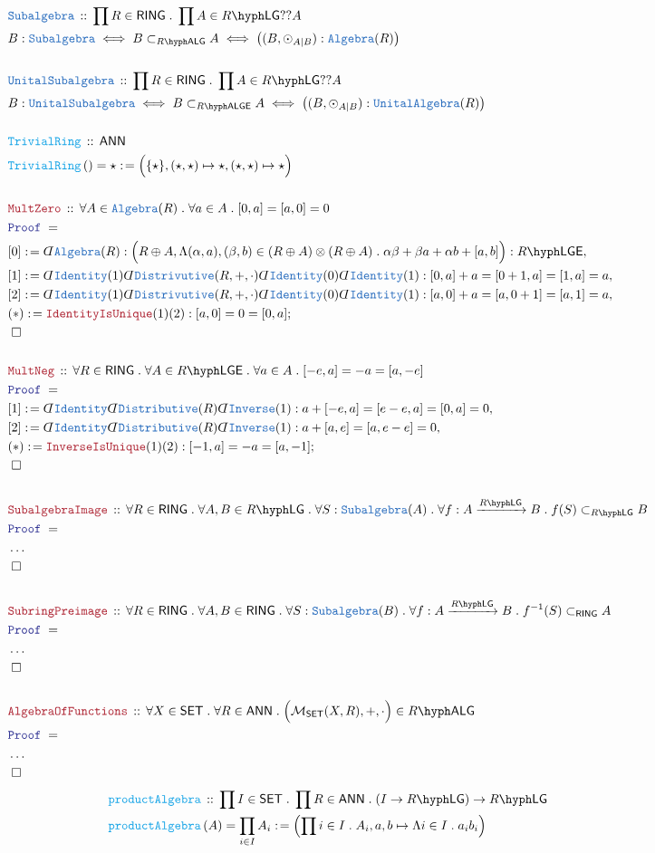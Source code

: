\documentclass[12pt]{scrartcl}%
\newcommand{\TYPE}[1]{\textcolor{NavyBlue}{\mathtt{#1}}}%
\newcommand{\FUNC}[1]{\textcolor{Cerulean}{\mathtt{#1}}}%
\newcommand{\LOGIC}[1]{\textcolor{Blue}{\mathtt{#1}}}%
\newcommand{\THM}[1]{\textcolor{Maroon}{\mathtt{#1}}}%
\renewcommand{\.}{\; . \;} %
\newcommand{\de}{: \kern 0.1pc =} %
\newcommand{\Act}[1]{\left( #1 \right)} %
\newcommand{\Theorem}[2]{& \THM{#1} \, :: \, #2 \\ & \Proof = \\ } %
\newcommand{\DeclareType}[2]{& \TYPE{#1} \, :: \, #2 \\}%
\newcommand{\DefineNamedType}[4]{& #1 : \TYPE{#2} \iff #3 \iff #4 \\}%
\newcommand{\DeclareFunc}[2]{& \FUNC{#1} \, :: \, #2 \\}%
\newcommand{\DefineNamedFunc}[4]{&  \FUNC{#1}\Act{#2} = #3 \de #4 \\}%
\newcommand{\Page}[1]{ \begin{align*} #1 \end{align*}  }%
\newcommand{ \bd }{ \ByDef }%
\newcommand{\NoProof}{ & \ldots \\ \EndProof}%
\newcommand{\Mor}{\mathcal{M}}%
\newcommand{\Say}[3]{& #1 \de #2 : #3, \\} %
\newcommand{\Conclude}[3]{& #1 \de #2 : #3; \\}%
\newcommand{\QED}{\; \square} %
\newcommand{\EndProof}{& \QED \\} %
\newcommand{\ByDef}{\rotatebox[origin=c]{-180}{$D$}}%
\newcommand{\Proof}{\LOGIC{Proof} \; } %
\newcommand{\Arrow}[1]{\xrightarrow{#1}}%
\newcommand{\SET}{\mathsf{SET}} %
\newcommand{\RING}{\mathsf{RING}} %
\newcommand{\ANN}{\mathsf{ANN}} %
\newcommand{\Algebra}{\TYPE{Algebra}}
\newcommand{\LALG}[1]{#1\hyph\mathsf{ALG}}%
\newcommand{\LALGE}[1]{#1\hyph\mathsf{ALGE}}%
\newcommand{\LLGE}[1]{#1\hyph\mathsf{LGE}}%
\newcommand{\LLG}[1]{#1\hyph\mathsf{LG}}%
\begin{document}
{}\Page{
	\DeclareType{Subalgebra}{\prod R \in \RING \. \prod A \in \LLG{R} ??A}
	\DefineNamedType{B}{Subalgebra}{B \subset_{\LALG{R}} A}{\big((B,\odot_{A|B}) : \TYPE{Algebra}(R)\big)}
	\\
	\DeclareType{UnitalSubalgebra}{\prod R \in \RING \. \prod A \in \LLG{R} ??A}
	\DefineNamedType{B}{UnitalSubalgebra}{B \subset_{\LALGE{R}} A}{\big((B,\odot_{A|B}) : \TYPE{UnitalAlgebra}(R)\big)}
	\\
	\DeclareFunc{TrivialRing}{ \ANN  }
	\DefineNamedFunc{TrivialRing}{}{\star}{\Big(\{\star\}, (\star,\star) \mapsto \star, (\star,\star) \mapsto \star \Big)}
	\\
	\Theorem{MultZero}{\forall A \in \Algebra(R) \. \forall a \in A \. [0,a] = [a,0] = 0}
	\Say{[0]}{ \bd \Algebra(R) }{ \Big( R \oplus A ,\Lambda (\alpha,a),(\beta,b) \in (R \oplus A) \otimes (R \oplus A) \. \alpha \beta + \beta a + \alpha b + [a, b]   \Big) : \LLGE{R}  }
	\Say{[1]}{ \bd \TYPE{Identity}(1)\bd \TYPE{Distrivutive}(R,+,\cdot)\bd\TYPE{Identity}(0)\bd\TYPE{Identity}(1)  }{  [0,a] + a = [0 + 1,a] = [1,a] = a   }
	\Say{[2]}{ \bd \TYPE{Identity}(1)\bd \TYPE{Distrivutive}(R,+,\cdot)\bd\TYPE{Identity}(0)\bd\TYPE{Identity}(1)  }{  [a,0] + a = [a,0 + 1] = [a,1] = a  }
	\Conclude{(*)}{\THM{IdentityIsUnique}(1)(2)}{[a,0] = 0 = [0,a]}
	\EndProof
	\\
	\Theorem{MultNeg}{\forall R \in \RING \. \forall A \in \LLGE{R} \. \forall a \in A \. [-e,a] = -a = [a, -e] }
	\Say{[1]}{\bd \TYPE{Identity}\bd \TYPE{Distributive}(R)\bd \TYPE{Inverse}(1)}{ a + [-e,a] = [e - e,a] = [0,a] = 0}
	\Say{[2]}{\bd \TYPE{Identity}\bd \TYPE{Distributive}(R)\bd \TYPE{Inverse}(1)}{ a + [a,e] = [a,e - e] = 0}
	\Conclude{(*)}{\THM{InverseIsUnique}(1)(2)}{ [-1,a] = - a = [a,-1]}
	\EndProof
	\\
	\Theorem{SubalgebraImage}{\forall R \in \RING \. \forall A,B \in \LLG{R} \. \forall S : \TYPE{Subalgebra}(A) \. \forall f : A \Arrow{\LLG{R}} B \. f(S) \subset_{\LLG{R}} B}
	\NoProof
	\\
	\Theorem{SubringPreimage}{ \forall R \in \RING \. \forall A,B \in \RING \. \forall S : \TYPE{Subalgebra}(B) \. \forall f : A \Arrow{\LLG{R}} B \. f^{-1}(S) \subset_{\RING} A}
	\NoProof
	\\
	\Theorem{AlgebraOfFunctions}{\forall X \in \SET \. \forall R \in \ANN \. \Big(\Mor_{\SET}(X,R),+,\cdot\Big) \in \LALG{R}}
	\NoProof
}\Page{
	\DeclareFunc{productAlgebra}{ \prod I \in \SET \. \prod R \in \ANN \.  (I \to  \LLG{R}) \to \LLG{R}}
	\DefineNamedFunc{productAlgebra}{A}{\prod_{i \in I} A_i}{  \left( \prod i \in I \. A_i,  a,b \mapsto \Lambda i \in I \.  a_ib_i \right)}
}
\end{document}
